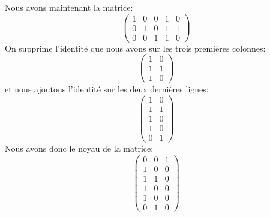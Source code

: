 \begin{example}
    Nous avons maintenant la matrice:
    \[\begin{pmatrix}
        1 & 0 & 0 & 1 & 0\\
        0 & 1 & 0 & 1 & 1\\
        0 & 0 & 1 & 1 & 0
    \end{pmatrix}\]
    On supprime l'identité que nous avons sur les trois premières colonnes:
    \[\begin{pmatrix}
        1 & 0\\
        1 & 1\\
        1 & 0
    \end{pmatrix}\]
    et nous ajoutons l'identité sur les deux dernières lignes:
    \[\begin{pmatrix}
        1 & 0\\
        1 & 1\\
        1 & 0\\
        1 & 0\\
        0 & 1
    \end{pmatrix}\]
    Nous avons donc le noyau de la matrice:
    \[\begin{pmatrix}
        0 & 0 & 1\\
        1 & 0 & 0\\
        1 & 1 & 0\\
        1 & 0 & 0\\
        1 & 0 & 0\\
        0 & 1 & 0
    \end{pmatrix}\]
\end{example}